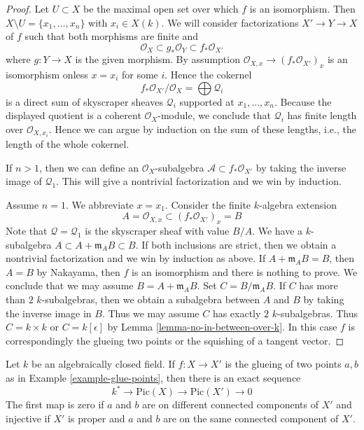 \begin{proof}
Let $U \subset X$ be the maximal open set over which $f$ is an isomorphism.
Then $X \setminus U = \{x_1, \ldots, x_n\}$ with $x_i \in X(k)$.
We will consider factorizations $X' \to Y \to X$ of $f$ such that
both morphisms are finite and
$$
\mathcal{O}_X \subset g_*\mathcal{O}_Y \subset f_*\mathcal{O}_{X'}
$$
where $g : Y \to X$ is the given morphism. By assumption
$\mathcal{O}_{X, x} \to (f_*\mathcal{O}_{X'})_x$ is an isomorphism
onless $x = x_i$ for some $i$. Hence the cokernel
$$
f_*\mathcal{O}_{X'}/\mathcal{O}_X = \bigoplus \mathcal{Q}_i
$$
is a direct sum of skyscraper sheaves $\mathcal{Q}_i$ supported at
$x_1, \ldots, x_n$.
Because the displayed quotient is a coherent $\mathcal{O}_X$-module,
we conclude that $\mathcal{Q}_i$ has finite length over
$\mathcal{O}_{X, x_i}$. Hence we can argue
by induction on the sum of these lengths, i.e., the length of
the whole cokernel.

\medskip\noindent
If $n > 1$, then we can define an $\mathcal{O}_X$-subalgebra
$\mathcal{A} \subset f_*\mathcal{O}_{X'}$ by taking the inverse
image of $\mathcal{Q}_1$. This will give a nontrivial factorization
and we win by induction.

\medskip\noindent
Assume $n = 1$. We abbreviate $x = x_1$. Consider the finite
$k$-algebra extension
$$
A = \mathcal{O}_{X, x} \subset (f_*\mathcal{O}_{X'})_x = B
$$
Note that $\mathcal{Q} = \mathcal{Q}_1$ is the skyscraper sheaf
with value $B/A$.
We have a $k$-subalgebra $A \subset A + \mathfrak m_A B \subset B$.
If both inclusions are strict, then we obtain a nontrivial
factorization and we win by induction as above.
If $A + \mathfrak m_A B = B$, then $A = B$ by Nakayama, then
$f$ is an isomorphism and there is nothing to prove.
We conclude that we may assume $B = A + \mathfrak m_A B$.
Set $C = B/\mathfrak m_A B$. If $C$ has more than $2$
$k$-subalgebras, then we obtain a subalgebra between $A$
and $B$ by taking the inverse image in $B$. Thus we may
assume $C$ has exactly $2$ $k$-subalgebras. Thus $C = k \times k$
or $C = k[\epsilon]$ by Lemma \ref{lemma-no-in-between-over-k}.
In this case $f$ is correspondingly the glueing two points or the
squishing of a tangent vector.
\end{proof}

\begin{lemma}
\label{lemma-glue-points}
Let $k$ be an algebraically closed field. If $f : X \to X'$ is the
glueing of two points $a, b$ as in Example \ref{example-glue-points}, then
there is an exact sequence
$$
k^* \to \text{Pic}(X) \to \text{Pic}(X') \to 0
$$
The first map is zero if $a$ and $b$ are on different
connected components of $X'$ and injective
if $X'$ is proper and $a$ and $b$ are on the same connected component of $X'$.
\end{lemma}

